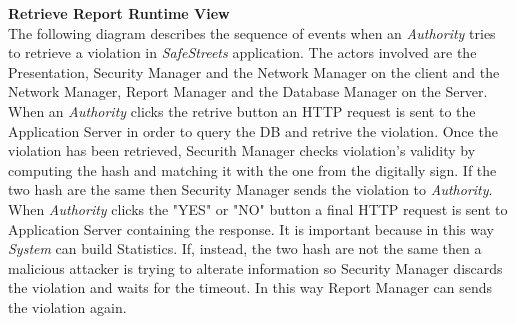 \documentclass{article}
\begin{document}
\clearpage
\textbf{Retrieve Report Runtime View}\\
The following diagram describes the sequence of events when an \textit{Authority} tries to retrieve a violation in
\textit{SafeStreets} application. The actors involved are the Presentation, Security Manager and the Network 
Manager on the client and the Network Manager, Report Manager and the Database Manager on the Server.
When an \textit{Authority} clicks the retrive button an HTTP request is sent to the Application Server in order to
query the DB and retrive the violation. Once the violation has been retrieved, Securith Manager checks violation's 
validity by computing the hash and matching it with the one from the digitally sign. If the two hash are the same then
Security Manager sends the violation to \textit{Authority}. When \textit{Authority} clicks the "YES" or "NO" button a final
HTTP request is sent to Application Server containing the response. It is important because in this way \textit{System} can
build Statistics. If, instead, the two hash are not the same then a malicious attacker is trying to alterate information so
Security Manager discards the violation and waits for the timeout. In this way Report Manager can sends the violation again.     
\end{document}
